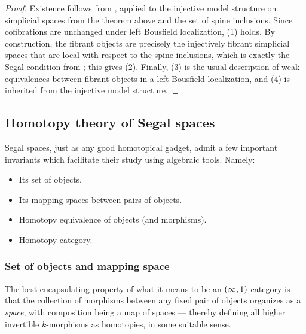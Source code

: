 \begin{proof}
    Existence follows from ,
    applied to the injective model structure on simplicial spaces from the
    theorem above and the set of spine inclusions. Since cofibrations are
    unchanged under left Bousfield localization, (1) holds. By construction,
    the fibrant objects are precisely the injectively fibrant simplicial spaces
    that are local with respect to the spine inclusions, which is exactly the
    Segal condition from ; this gives (2). Finally,
    (3) is the usual description of weak equivalences between fibrant objects in
    a left Bousfield localization, and (4) is inherited from the injective
    model structure.
\end{proof}

\subsection{Homotopy theory of Segal spaces}

Segal spaces, just as any good homotopical gadget, admit a few important
invariants which facilitate their study using algebraic tools. Namely:

\begin{itemize}
    \item Its set of objects.
    \item Its mapping spaces between pairs of objects.
    \item Homotopy equivalence of objects (and morphisms).
    \item Homotopy category.
\end{itemize}


\subsubsection{Set of objects and mapping space}

The best encapsulating property of what it means to be an $(\operatorname{\infty},1)$-category is that the collection of morphisms between any fixed pair of objects organizes as a \emph{space}, with composition being a map of spaces — thereby defining all higher invertible $k$-morphisms as homotopies, in some suitable sense.

